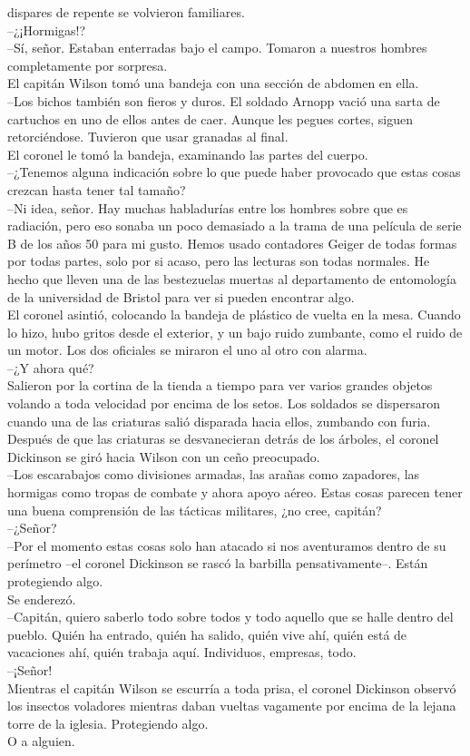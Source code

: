 dispares de repente se volvieron familiares.\\
--¿¡Hormigas!?\\
--Sí, señor. Estaban enterradas bajo el campo. Tomaron a nuestros
hombres completamente por sorpresa.\\
El capitán Wilson tomó una bandeja con una sección de abdomen en ella.\\
--Los bichos también son fieros y duros. El soldado Arnopp vació una
sarta de cartuchos en uno de ellos antes de caer. Aunque les pegues
cortes, siguen retorciéndose. Tuvieron que usar granadas al final.\\
El coronel le tomó la bandeja, examinando las partes del cuerpo.\\
--¿Tenemos alguna indicación sobre lo que puede haber provocado que
estas cosas crezcan hasta tener tal tamaño?\\
--Ni idea, señor. Hay muchas habladurías entre los hombres sobre que es
radiación, pero eso sonaba un poco demasiado a la trama de una película
de serie B de los años 50 para mi gusto. Hemos usado contadores Geiger
de todas formas por todas partes, solo por si acaso, pero las lecturas
son todas normales. He hecho que lleven una de las bestezuelas muertas
al departamento de entomología de la universidad de Bristol para ver si
pueden encontrar algo.\\
El coronel asintió, colocando la bandeja de plástico de vuelta en la
mesa. Cuando lo hizo, hubo gritos desde el exterior, y un bajo ruido
zumbante, como el ruido de un motor. Los dos oficiales se miraron el uno
al otro con alarma.\\
--¿Y ahora qué?\\
Salieron por la cortina de la tienda a tiempo para ver varios grandes
objetos volando a toda velocidad por encima de los setos. Los soldados
se dispersaron cuando una de las criaturas salió disparada hacia ellos,
zumbando con furia.\\
Después de que las criaturas se desvanecieran detrás de los árboles, el
coronel Dickinson se giró hacia Wilson con un ceño preocupado.\\
--Los escarabajos como divisiones armadas, las arañas como zapadores,
las hormigas como tropas de combate y ahora apoyo aéreo. Estas cosas
parecen tener una buena comprensión de las tácticas militares, ¿no cree,
capitán?\\
--¿Señor?\\
--Por el momento estas cosas solo han atacado si nos aventuramos dentro
de su perímetro --el coronel Dickinson se rascó la barbilla
pensativamente--. Están protegiendo algo.\\
Se enderezó.\\
--Capitán, quiero saberlo todo sobre todos y todo aquello que se halle
dentro del pueblo. Quién ha entrado, quién ha salido, quién vive ahí,
quién está de vacaciones ahí, quién trabaja aquí. Individuos, empresas,
todo.\\
--¡Señor!\\
Mientras el capitán Wilson se escurría a toda prisa, el coronel
Dickinson observó los insectos voladores mientras daban vueltas
vagamente por encima de la lejana torre de la iglesia. Protegiendo
algo.\\
O a alguien.\\
